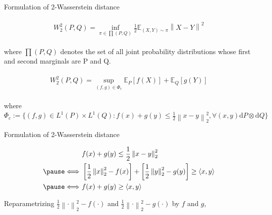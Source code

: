 \documentclass{beamer}		%
\newcommand{\dd}{\mathrm{d}}
\begin{document}
\begin{frame}{Formulation of 2-Wasserstein distance}

\begin{eqnarray}\label{eq:W2origin}
\begin{aligned}
W_2^2 (P, Q) = \inf_{\pi \in \prod (P,Q)} \frac{1}{2} \mathbb{E}_{(X,Y) \sim \pi} \left\| X - Y \right\|^2
\end{aligned}    
\end{eqnarray}

where $\prod (P,Q)$ denotes the set of all joint probability distributions whose first and second marginals are P and Q.

\pause

\begin{eqnarray}\label{eq:W2dual}
\begin{aligned}
W_2^2 (P, Q) = \sup_{(f,g) \in \Phi_c} \mathbb{E}_P [f(X)] + \mathbb{E}_Q [ g(Y) ]
\end{aligned}    
\end{eqnarray}

where $\Phi_c := \{ (f,g) \in L^1(P) \times L^1(Q): f(x)+g(y) \leq \frac{1}{2} \left\|x-y \right\|_2^2, \forall (x,y) \dd P \otimes \dd Q \}$


    
\end{frame}









\begin{frame}{Formulation of 2-Wasserstein distance}

\begin{eqnarray*}
\begin{aligned}
    & f(x)+g(y) \leq \frac{1}{2} \left\|x-y \right\|_2^2 \\
    \pause
    \Longleftrightarrow\ &\left[\frac{1}{2} \left\| x\right\|_2^2-f(x) \right] + \left[\frac{1}{2} \left\| y\right\|_2^2-g(y) \right] \ge \left \langle x,y \right \rangle\\
    \pause
    \Longleftrightarrow\ & f(x) + g(y) \ge \left \langle x,y \right \rangle
\end{aligned}    
\end{eqnarray*}

Reparametrizing $\frac{1}{2} \left\| \cdot \right\|_2^2-f(\cdot)$ and $\frac{1}{2} \left\| \cdot \right\|_2^2-g(\cdot)$ by $f$ and $g$,
    
\end{frame}
\end{document}
